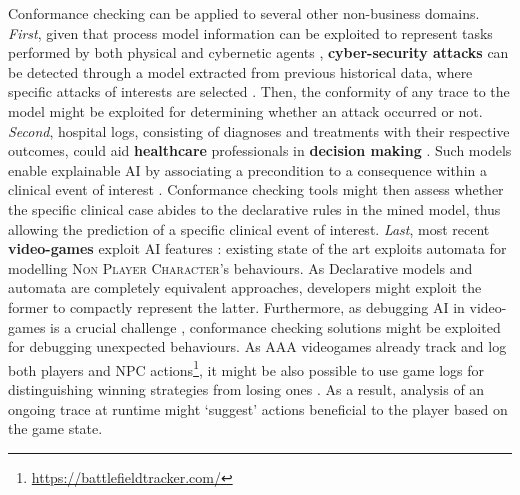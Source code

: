 {Conformance checking can be applied to several other non-business domains.} 
 \textit{First}, given that process model information can be exploited to represent 
  tasks performed by both physical and cybernetic agents \cite{Ioanna}, %
   \textbf{cyber-security attacks} can be detected through a model extracted from previous historical data, where specific attacks of interests are selected \cite{BENASHER201551,LagraaS20}. Then, the conformity of any trace to the model might be exploited for determining whether an attack occurred or not. \textit{Second},  hospital logs, consisting of diagnoses and treatments with their respective outcomes, could aid \textbf{healthcare} professionals in  \textbf{decision making} \cite{Amantea2020}. Such models enable explainable AI by associating a precondition to a consequence within a  clinical event of interest \cite{mining,KusumaKMHGJ20}. Conformance checking tools might then assess whether the specific clinical case abides to the declarative rules in the mined model, thus allowing the prediction of a specific clinical event of interest. \textit{Last}, most recent \textbf{video-games}  exploit AI features \cite{LiGT21}: existing state of the art exploits automata \cite{Miyake2017} for modelling \textsc{Non Player Character}'s behaviours. As Declarative models and automata are completely equivalent approaches, developers might exploit the former to  compactly represent the latter. Furthermore, as debugging AI in video-games is a crucial challenge \cite{john2019debugging}, conformance checking solutions might be exploited for debugging unexpected behaviours. As AAA videogames already  track and log both players and NPC actions\footnote{\url{https://battlefieldtracker.com/}}, it might be also possible to use game logs for distinguishing winning strategies from losing ones \cite{mining}. As a result, analysis of an ongoing trace at runtime might `suggest'  actions beneficial to the player based on the game state.%

